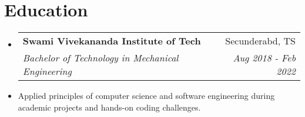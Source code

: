 \documentclass[letterpaper,11pt]{article}
\makeatletter
\newcommand{\resumeItem}[1]{
  \item\small{
    {#1 \vspace{-2pt}}
  }
}
\newcommand{\resumeSubheading}[4]{
  \vspace{-2pt}\item
    \begin{tabular*}{0.97\textwidth}[t]{l@{\extracolsep{\fill}}r}
      \textbf{#1} & #2 \\
      \textit{\small#3} & \textit{\small #4} \\
    \end{tabular*}\vspace{-7pt}
}
\newcommand{\resumeSubHeadingListStart}{\begin{itemize}[leftmargin=0.15in, label={}]}
\newcommand{\resumeSubHeadingListEnd}{\end{itemize}}
\newcommand{\resumeItemListStart}{\begin{itemize}}
\newcommand{\resumeItemListEnd}{\end{itemize}\vspace{-5pt}}
\makeatother
\begin{document}
%

        
%

\section{Education}
  \resumeSubHeadingListStart
    \resumeSubheading
      {Swami Vivekananda Institute of Tech}{Secunderabd, TS}
      {Bachelor of Technology in Mechanical Engineering}{Aug 2018 - Feb 2022}
      \resumeItem{Applied principles of computer science and software engineering during academic projects and hands-on coding challenges.}
  \resumeSubHeadingListEnd




\end{document}
